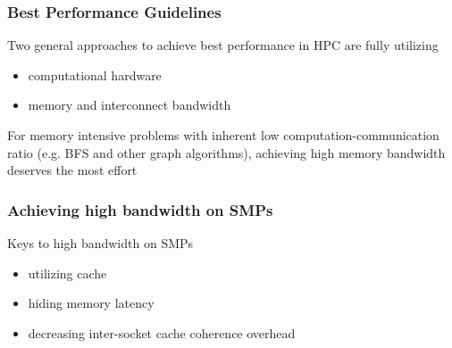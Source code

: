 \documentclass[]{beamer}
\begin{document}
\begin{frame}
  \frametitle{Best Performance Guidelines}
  Two general approaches to achieve best performance in HPC are fully utilizing
  \begin{itemize}
    \item computational hardware
    \item memory and interconnect bandwidth
  \end{itemize}
  For memory intensive problems with inherent low computation-communication ratio
  (e.g. BFS and other graph algorithms),
  achieving high memory bandwidth deserves the most effort
\end{frame}

\begin{frame}
  \frametitle{Achieving high bandwidth on SMPs}
  Keys to high bandwidth on SMPs
  \begin{itemize}
    \item utilizing cache
    \item hiding memory latency
    \item decreasing inter-socket cache coherence overhead
  \end{itemize}
  \begin{figure}
    \centering
\end{figure}
\end{frame}
\end{document}
